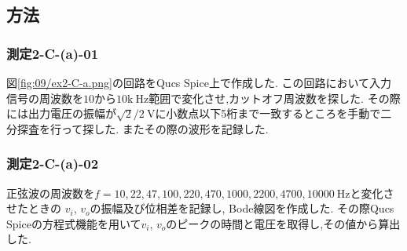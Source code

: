 \subsection{方法}
\subsubsection{測定2-C-(a)-01}
図\ref{fig:09/ex2-C-a.png}の回路をQucs Spice上で作成した.
この回路において入力信号の周波数を$10$から$10\si{\kilo}\ \si{\hertz}$範囲で変化させ,カットオフ周波数を探した.
その際には出力電圧の振幅が$\sqrt{2}/2\ \si{\volt}$に小数点以下5桁まで一致するところを手動で二分探査を行って探した.
またその際の波形を記録した.
\subsubsection{測定2-C-(a)-02}
正弦波の周波数を$f=10,22,47,100,220,470,1000,2200,4700,10000\ \si{\hertz}$と変化させたときの
$v_i$, $v_o$の振幅及び位相差を記録し, Bode線図を作成した.
その際Qucs Spiceの方程式機能を用いて$v_i$, $v_o$のピークの時間と電圧を取得し,その値から算出した.